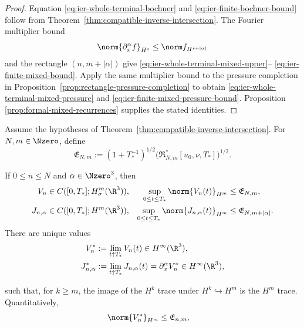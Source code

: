 \begin{proof}
Equation \eqref{eq:ier-whole-terminal-bochner} and
\eqref{eq:ier-finite-bochner-bound} follow from
Theorem~\ref{thm:compatible-inverse-intersection}.  The Fourier multiplier
bound
\[
 \norm{\partial_x^\alpha f}_{H^s}
 \le\norm f_{H^{s+|\alpha|}}
\]
and the rectangle \((n,m+|\alpha|)\) give
\eqref{eq:ier-whole-terminal-mixed-upper}--
\eqref{eq:ier-finite-mixed-bound}.  Apply the same multiplier bound to the
pressure completion in Proposition~\ref{prop:rectangle-pressure-completion}
to obtain \eqref{eq:ier-whole-terminal-mixed-pressure} and
\eqref{eq:ier-finite-mixed-pressure-bound}.  Proposition
\ref{prop:formal-mixed-recurrences} supplies the stated identities.
\end{proof}

\begin{theorem}
\label{thm:ier-compatible-endpoint-traces}
Assume the hypotheses of
Theorem~\ref{thm:compatible-inverse-intersection}.
For \(N,m\in\Nzero\), define
\begin{equation}
 \mathfrak E_{N,m}
 :=(1+T_*^{-1})^{1/2}
 \bigl(\mathfrak R_{N,m}^*[u_0,\nu,T_*]\bigr)^{1/2}.
 \label{eq:ier-endpoint-majorant}
\end{equation}
\begin{samepage}
If \(0\le n\le N\) and \(\alpha\in\Nzero^3\), then
\begin{align}
 V_n&\in C([0,T_*];H^m_\sigma(\R^3)),
 &\sup_{0\le t\le T_*}\norm{V_n(t)}_{H^m}
 &\le\mathfrak E_{N,m},
 \label{eq:ier-row-trace}\\
 J_{n,\alpha}&\in C([0,T_*];H^m(\R^3)),
 &\sup_{0\le t\le T_*}\norm{J_{n,\alpha}(t)}_{H^m}
 &\le\mathfrak E_{N,m+|\alpha|}.
 \label{eq:ier-mixed-row-trace}
\end{align}
There are unique values
\begin{align}
 V_n^*&:=\lim_{t\uparrow T_*}V_n(t)
 \in H^\infty(\R^3),
 \label{eq:ier-velocity-endpoint}\\
 J_{n,\alpha}^*&:=\lim_{t\uparrow T_*}J_{n,\alpha}(t)
 =\partial_x^\alpha V_n^*
 \in H^\infty(\R^3),
 \label{eq:ier-mixed-velocity-endpoint}
\end{align}
\par
\end{samepage}
such that, for \(k\ge m\), the image of the \(H^k\) trace under
\(H^k\hookrightarrow H^m\) is the \(H^m\) trace.  Quantitatively,
\begin{align}
 \norm{V_n^*}_{H^m}
 &\le\mathfrak E_{n,m},

\end{align}
\end{theorem}
